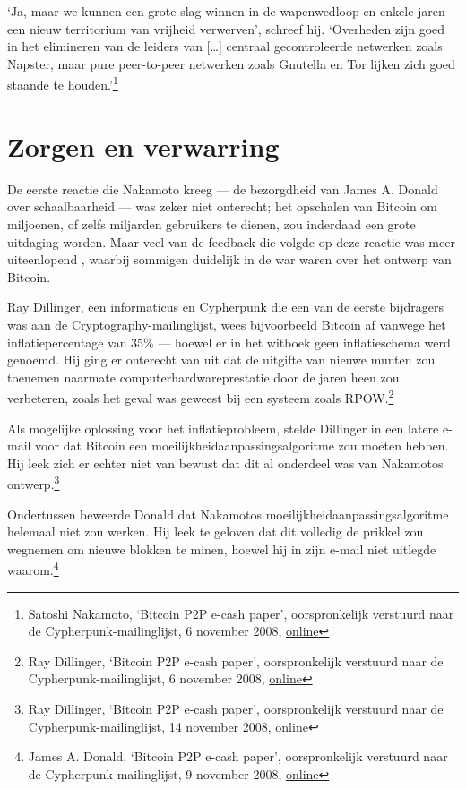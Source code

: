 \documentclass[
  a5paper,
  smalldemyvopaper,11pt,twoside,onecolumn,openright,extrafontsizes]{memoir}
\begin{document}
`Ja, maar we kunnen een grote slag winnen in de wapenwedloop en enkele
jaren een nieuw territorium van vrijheid verwerven', schreef hij.
`Overheden zijn goed in het elimineren van de leiders van {[}\ldots{]}
centraal gecontroleerde netwerken zoals Napster, maar pure peer-to-peer
netwerken zoals Gnutella en Tor lijken zich goed staande te
houden.'\footnote{Satoshi Nakamoto, `Bitcoin P2P e-cash paper',
  oorspronkelijk verstuurd naar de Cypherpunk-mailinglijst, 6 november
  2008,
  \href{https://www.metzdowd.com/pipermail/cryptography/2008-November/014823.html}{online}}

\section{Zorgen en verwarring}\label{zorgen-en-verwarring}

De eerste reactie die Nakamoto kreeg --- de bezorgdheid van James A.
Donald over schaalbaarheid --- was zeker niet onterecht; het opschalen
van Bitcoin om miljoenen, of zelfs miljarden gebruikers te dienen, zou
inderdaad een grote uitdaging worden. Maar veel van de feedback die
volgde op deze reactie was meer uiteenlopend , waarbij sommigen
duidelijk in de war waren over het ontwerp van Bitcoin.

Ray Dillinger, een informaticus en Cypherpunk die een van de eerste
bijdragers was aan de Cryptography-mailinglijst, wees bijvoorbeeld
Bitcoin af vanwege het inflatiepercentage van 35\% --- hoewel er in het
witboek geen inflatieschema werd genoemd. Hij ging er onterecht van uit
dat de uitgifte van nieuwe munten zou toenemen naarmate
computerhardwareprestatie door de jaren heen zou verbeteren, zoals het
geval was geweest bij een systeem zoals RPOW.\footnote{Ray Dillinger,
  `Bitcoin P2P e-cash paper', oorspronkelijk verstuurd naar de
  Cypherpunk-mailinglijst, 6 november 2008,
  \href{https://www.metzdowd.com/pipermail/cryptography/2008-November/014822.html}{online}}

Als mogelijke oplossing voor het inflatieprobleem, stelde Dillinger in
een latere e-mail voor dat Bitcoin een moeilijkheidaanpassingsalgoritme
zou moeten hebben. Hij leek zich er echter niet van bewust dat dit al
onderdeel was van Nakamotos ontwerp.\footnote{Ray Dillinger, `Bitcoin
  P2P e-cash paper', oorspronkelijk verstuurd naar de
  Cypherpunk-mailinglijst, 14 november 2008,
  \href{https://www.metzdowd.com/pipermail/cryptography/2008-November/014857.html}{online}}

Ondertussen beweerde Donald dat Nakamotos
moeilijkheidaanpassingsalgoritme helemaal niet zou werken. Hij leek te
geloven dat dit volledig de prikkel zou wegnemen om nieuwe blokken te
minen, hoewel hij in zijn e-mail niet uitlegde waarom.\footnote{James A.
  Donald, `Bitcoin P2P e-cash paper', oorspronkelijk verstuurd naar de
  Cypherpunk-mailinglijst, 9 november 2008,
  \href{https://www.metzdowd.com/pipermail/cryptography/2008-November/014837.html}{online}}
\end{document}
